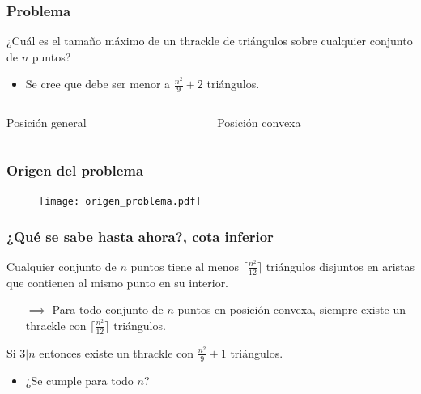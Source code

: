 \documentclass{beamer}
\begin{document}
\begin{frame}
  \frametitle{Problema}
  \begin{block}{}
    ¿Cuál es el tamaño máximo de un thrackle de triángulos sobre
    cualquier conjunto de $n$ puntos?
    \begin{itemize}
      \item Se cree que debe ser menor a $\frac{n^2}{9}+2$ triángulos.
    \end{itemize}
  \end{block}
  \begin{columns}
    \begin{column}{0.5\textwidth}
      \begin{center}
        \begin{figure}[htb]
          \centering
          \def\svgwidth{4.5cm}
          
        \end{figure}
      Posición general
      \end{center}
    \end{column}
    \begin{column}{0.5\textwidth}
      \begin{center}
      \begin{figure}[htb]
        \centering
        \def\svgwidth{4.5cm}
        
      \end{figure}
      Posición convexa
      \end{center}
    \end{column}
  \end{columns}
\end{frame}

\begin{frame}
  \frametitle{Origen del problema}
  \begin{figure}[htb]
    \texttt{[image: origen\_problema.pdf]}
  \end{figure}
\end{frame}

\begin{frame}
  \frametitle{¿Qué se sabe hasta ahora?, cota inferior}
  Cualquier conjunto de $n$ puntos tiene al menos $\lceil\frac{n^2}{12}\rceil$ triángulos
  disjuntos en aristas que contienen al mismo punto en su interior.
  \begin{figure}[htb]
    \def\svgwidth{3cm}
    
  \end{figure}
  \begin{itemize}[leftmargin=2cm]
    \item[$\implies$] Para todo conjunto de $n$ puntos en posición convexa, siempre existe un
      thrackle con $\lceil\frac{n^2}{12}\rceil$ triángulos.
  \end{itemize}
  Si $3|n$ entonces existe un thrackle con $\frac{n^2}{9}+1$ triángulos.
  \begin{itemize}[leftmargin=1cm]
    \item ¿Se cumple para todo $n$?
  \end{itemize}
\end{frame}
\end{document}
